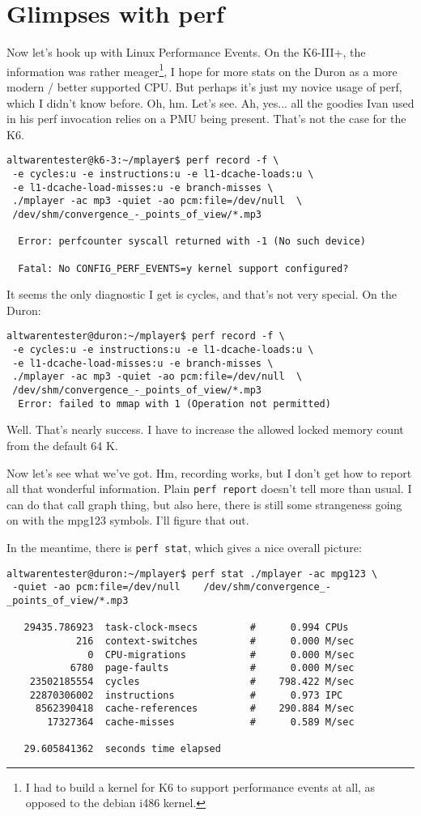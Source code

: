 \documentclass[a4paper,12pt]{scrartcl}
\begin{document}
\section{Glimpses with perf}

Now let's hook up with Linux Performance Events. On the K6-III+, the information was rather meager\footnote{I had to build a kernel for K6 to support performance events at all, as opposed to the debian i486 kernel.}, I hope for more stats on the Duron as a more modern / better supported CPU.
But perhaps it's just my novice usage of perf, which I didn't know before. Oh, hm. Let's see. Ah, yes... all the goodies Ivan used in his perf invocation relies on a PMU being present. That's not the case for the K6.
\begin{verbatim}
altwarentester@k6-3:~/mplayer$ perf record -f \
 -e cycles:u -e instructions:u -e l1-dcache-loads:u \
 -e l1-dcache-load-misses:u -e branch-misses \
 ./mplayer -ac mp3 -quiet -ao pcm:file=/dev/null  \
 /dev/shm/convergence_-_points_of_view/*.mp3

  Error: perfcounter syscall returned with -1 (No such device)

  Fatal: No CONFIG_PERF_EVENTS=y kernel support configured?
\end{verbatim}
It seems the only diagnostic I get is cycles, and that's not very special. On the Duron:
\begin{verbatim}
altwarentester@duron:~/mplayer$ perf record -f \
 -e cycles:u -e instructions:u -e l1-dcache-loads:u \
 -e l1-dcache-load-misses:u -e branch-misses \
 ./mplayer -ac mp3 -quiet -ao pcm:file=/dev/null  \
 /dev/shm/convergence_-_points_of_view/*.mp3
  Error: failed to mmap with 1 (Operation not permitted)
\end{verbatim}
Well. That's nearly success. I have to increase the allowed locked memory count from the default 64 K.

Now let's see what we've got. Hm, recording works, but I don't get how to report all that wonderful information.
Plain \verb:perf report: doesn't tell more than usual. I can do that call graph thing, but also here, there is still some strangeness going on with the mpg123 symbols. I'll figure that out.

In the meantime, there is \verb:perf stat:, which gives a nice overall picture:

\begin{verbatim}
altwarentester@duron:~/mplayer$ perf stat ./mplayer -ac mpg123 \
 -quiet -ao pcm:file=/dev/null    /dev/shm/convergence_-_points_of_view/*.mp3

   29435.786923  task-clock-msecs         #      0.994 CPUs 
            216  context-switches         #      0.000 M/sec
              0  CPU-migrations           #      0.000 M/sec
           6780  page-faults              #      0.000 M/sec
    23502185554  cycles                   #    798.422 M/sec
    22870306002  instructions             #      0.973 IPC  
     8562390418  cache-references         #    290.884 M/sec
       17327364  cache-misses             #      0.589 M/sec

   29.605841362  seconds time elapsed
\end{verbatim}
\end{document}
